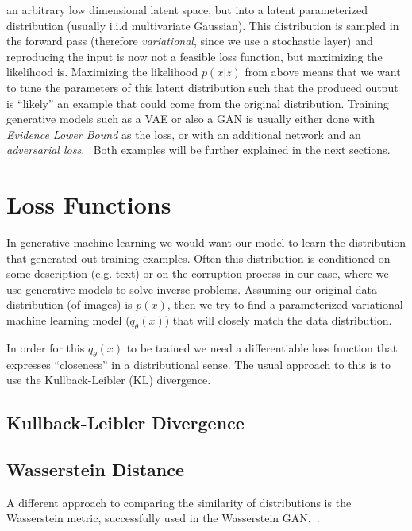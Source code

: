an arbitrary low dimensional latent space, but into a latent parameterized distribution (usually i.i.d multivariate Gaussian). This distribution is sampled
in the forward pass (therefore \textit{variational}, since we use a stochastic layer) and reproducing the input is now not a feasible loss function, but
maximizing the likelihood is. Maximizing the likelihood $p(x|z)$ from above means that we want to tune the parameters of this latent distribution such that the produced
output is \enquote{likely} an example that could come from the original distribution. Training generative models such as a VAE or also a GAN is usually either done with \textit{Evidence Lower Bound} as the loss, or with an additional network and an \textit{adversarial loss}.~\autocite{goodfellow2014generative} Both examples will be further explained in the next sections.

\section{Loss Functions}
In generative machine learning we would want our model to learn the distribution that generated
out training examples. Often this distribution is conditioned on some description (e.g. text) or 
on the corruption process in our case, where we use generative models to solve inverse problems.
Assuming our original data distribution (of images) is $p(x)$, then we try to find a parameterized 
variational machine learning model ($q_{\theta}(x)$) that will closely match the data distribution.

In order for this $q_{\theta}(x)$ to be trained we need a differentiable loss function that expresses
\enquote{closeness} in a distributional sense. The usual approach to this is to use the Kullback-Leibler (KL)
divergence.

\subsection{Kullback-Leibler Divergence}

\subsection{Wasserstein Distance}
A different approach to comparing the similarity of distributions is the Wasserstein metric, successfully used in the Wasserstein GAN.~\autocite{arjovsky2017wasserstein}.